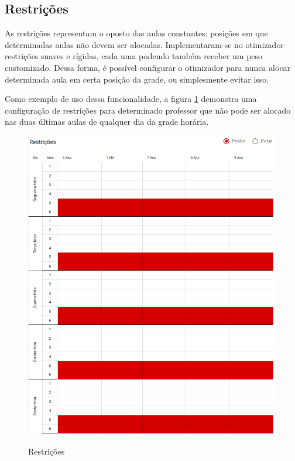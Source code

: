 \subsection{Restrições}

As restrições representam o oposto das aulas constantes: posições em que determinadas aulas não devem ser alocadas. Implementaram-se no otimizador restrições suaves e rígidas, cada uma podendo também receber um peso customizado. Dessa forma, é possível configurar o otimizador para nunca alocar determinada aula em certa posição da grade, ou simplesmente evitar isso.

Como exemplo de uso dessa funcionalidade, a figura \ref{fig:restricoes} demonstra uma configuração de restrições para determinado professor que não pode ser alocado nas duas últimas aulas de qualquer dia da grade horária.

\begin{figure}[!htb]
	\centering
	\caption{Restrições}
	\includegraphics[width=1\textwidth]{./dados/figuras/restricoes}
	\label{fig:restricoes}
\end{figure}
\pagebreak

